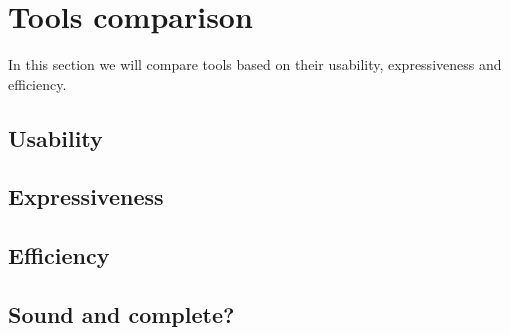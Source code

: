 
\section{Tools comparison}
\label{section:features-comparison}
In this section we will compare tools based on their usability, expressiveness and efficiency.

\subsection{Usability}

\subsection{Expressiveness}

\subsection{Efficiency}







\subsection{Sound and complete?}


